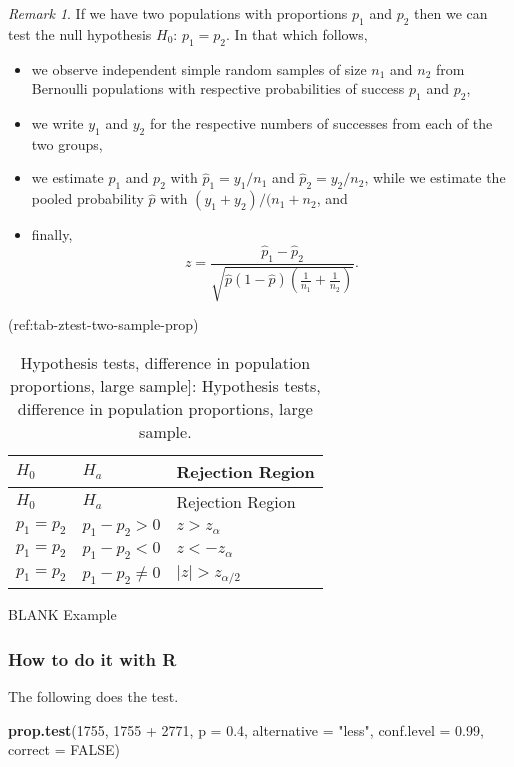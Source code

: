 \documentclass[]{book}
\newenvironment{Shaded}{\begin{snugshade}}{\end{snugshade}}
\newcommand{\KeywordTok}[1]{\textcolor[rgb]{0.13,0.29,0.53}{\textbf{{#1}}}}
\newcommand{\DataTypeTok}[1]{\textcolor[rgb]{0.13,0.29,0.53}{{#1}}}
\newcommand{\DecValTok}[1]{\textcolor[rgb]{0.00,0.00,0.81}{{#1}}}
\newcommand{\FloatTok}[1]{\textcolor[rgb]{0.00,0.00,0.81}{{#1}}}
\newcommand{\StringTok}[1]{\textcolor[rgb]{0.31,0.60,0.02}{{#1}}}
\newcommand{\OtherTok}[1]{\textcolor[rgb]{0.56,0.35,0.01}{{#1}}}
\newcommand{\NormalTok}[1]{{#1}}
\providecommand{\tightlist}{%
  \setlength{\itemsep}{0pt}\setlength{\parskip}{0pt}}
\numberwithin{equation}{chapter}
\numberwithin{figure}{chapter}
\theoremstyle{plain}
\theoremstyle{definition}
\theoremstyle{remark}
\theoremstyle{definition}
\theoremstyle{definition}
\theoremstyle{remark}
\newtheorem*{remark}{Remark}
\begin{document}
\begin{remark}
If we have two populations with proportions \(p_{1}\) and \(p_{2}\) then
we can test the null hypothesis \(H_{0}:\,p_{1} = p_{2}\). In that which
follows,

\begin{itemize}
\tightlist
\item
  we observe independent simple random samples of size \(n_{1}\) and
  \(n_{2}\) from Bernoulli populations with respective probabilities of
  success \(p_{1}\) and \(p_{2}\),
\item
  we write \(y_{1}\) and \(y_{2}\) for the respective numbers of
  successes from each of the two groups,
\item
  we estimate \(p_{1}\) and \(p_{2}\) with
  \(\hat{p}_{1} = y_{1}/n_{1}  \) and \(\hat{p}_{2} = y_{2}/n_{2}\),
  while we estimate the pooled probability \(\hat{p}\) with
  \((y_{1} + y_{2})/(n_{1} + n_{2}\), and
\item
  finally,
  \[z = \frac{\hat{p}_{1} - \hat{p}_{2}}{\sqrt{\hat{p}(1 - \hat{p})\left( \frac{1}{n_{1}} + \frac{1}{n_{2}} \right)}}. \]
\end{itemize}
\end{remark}

\bigskip

(ref:tab-ztest-two-sample-prop)

\begin{longtable}[]{@{}lll@{}}
\caption{Hypothesis tests, difference in population proportions, large
sample{]}: Hypothesis tests, difference in population proportions, large
sample.}\tabularnewline
\toprule
\(H_{0}\) & \(H_{a}\) & Rejection Region\tabularnewline
\midrule
\endfirsthead
\toprule
\(H_{0}\) & \(H_{a}\) & Rejection Region\tabularnewline
\midrule
\endhead
\(p_{1} = p_{2}\) & \(p_{1} - p_{2} > 0\) &
\(z > z_{\alpha}\)\tabularnewline
\(p_{1} = p_{2}\) & \(p_{1} - p_{2} < 0\) &
\(z < -z_{\alpha}\)\tabularnewline
\(p_{1} = p_{2}\) & \(p_{1} - p_{2} \neq 0\) &
\(\vert z \vert > z_{\alpha/2}\)\tabularnewline
\bottomrule
\end{longtable}

BLANK Example

\subsubsection{How to do it with R}\label{how-to-do-it-with-r-39}

The following does the test.

\begin{Shaded}
\begin{Highlighting}[]
\KeywordTok{prop.test}\NormalTok{(}\DecValTok{1755}\NormalTok{, }\DecValTok{1755} \NormalTok{+}\StringTok{ }\DecValTok{2771}\NormalTok{, }\DataTypeTok{p =} \FloatTok{0.4}\NormalTok{, }\DataTypeTok{alternative =} \StringTok{"less"}\NormalTok{, }
          \DataTypeTok{conf.level =} \FloatTok{0.99}\NormalTok{, }\DataTypeTok{correct =} \OtherTok{FALSE}\NormalTok{)}
\end{Highlighting}
\end{Shaded}
\end{document}
